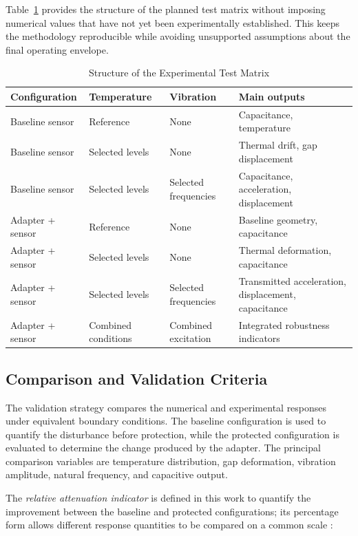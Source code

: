 \documentclass[conference]{IEEEtran}
\begin{document}
Table~\ref{tab:testmatrix} provides the structure of the planned test matrix without imposing numerical values that have not yet been experimentally established. This keeps the methodology reproducible while avoiding unsupported assumptions about the final operating envelope.

\begin{table}[t]
\caption{Structure of the Experimental Test Matrix}
\label{tab:testmatrix}
\centering
\footnotesize
\begin{tabular}{p{} p{} p{} p{}}
\toprule
\textbf{Configuration} & \textbf{Temperature} & \textbf{Vibration} & \textbf{Main outputs} \\
\midrule
Baseline sensor & Reference & None & Capacitance, temperature \\
Baseline sensor & Selected levels & None & Thermal drift, gap displacement \\
Baseline sensor & Selected levels & Selected frequencies & Capacitance, acceleration, displacement \\
Adapter + sensor & Reference & None & Baseline geometry, capacitance \\
Adapter + sensor & Selected levels & None & Thermal deformation, capacitance \\
Adapter + sensor & Selected levels & Selected frequencies & Transmitted acceleration, displacement, capacitance \\
Adapter + sensor & Combined conditions & Combined excitation & Integrated robustness indicators \\
\bottomrule
\end{tabular}
\end{table}

\subsection{Comparison and Validation Criteria}

The validation strategy compares the numerical and experimental responses under equivalent boundary conditions. The baseline configuration is used to quantify the disturbance before protection, while the protected configuration is evaluated to determine the change produced by the adapter. The principal comparison variables are temperature distribution, gap deformation, vibration amplitude, natural frequency, and capacitive output.

The \textit{relative attenuation indicator} is defined in this work to quantify the improvement between the baseline and protected configurations; its percentage form allows different response quantities to be compared on a common scale \cite{Schwenck2021}:
\end{document}

